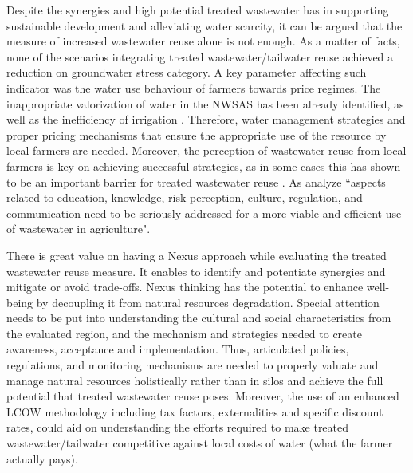 Despite the synergies and high potential treated wastewater has in supporting sustainable development and alleviating water scarcity, it can be argued that the measure of increased wastewater reuse alone is not enough. As a matter of facts, none of the scenarios integrating treated wastewater/tailwater reuse achieved a reduction on groundwater stress category. A key parameter affecting such indicator was the water use behaviour of farmers towards price regimes. The inappropriate valorization of water in the NWSAS has been already identified, as well as the inefficiency of irrigation \cite{BetterValorizationIrrigation2015}. Therefore, water management strategies and proper pricing mechanisms that ensure the appropriate use of the resource by local farmers are needed. Moreover, the perception of wastewater reuse from local farmers is key on achieving successful strategies, as in some cases this has shown to be an important barrier for treated wastewater reuse \cite{mahjoubPublicAcceptanceWastewater2018}. As \citet{mahjoubPublicAcceptanceWastewater2018} analyze ``aspects related to education, knowledge, risk perception, culture, regulation, and communication need to be seriously addressed for a more viable and efficient use of wastewater in agriculture".

There is great value on having a Nexus approach while evaluating the treated wastewater reuse measure. It enables to identify and potentiate synergies and mitigate or avoid trade-offs. Nexus thinking has the potential to enhance well-being by decoupling it from natural resources degradation. Special attention needs to be put into understanding the cultural and social characteristics from the evaluated region, and the mechanism and strategies needed to create awareness, acceptance and implementation. Thus, articulated policies, regulations, and monitoring mechanisms are needed to properly valuate and manage natural resources holistically rather than in silos and achieve the full potential that treated wastewater reuse poses. Moreover, the use of an enhanced LCOW methodology including tax factors, externalities and specific discount rates, could aid on understanding the efforts required to make treated wastewater/tailwater competitive against local costs of water (what the farmer actually pays).

